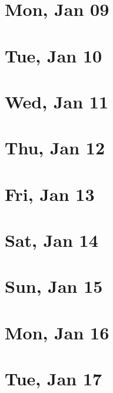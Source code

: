 	\section{Mon, Jan 09}
		
		
	\section{Tue, Jan 10}
		
		
	\section{Wed, Jan 11}
		
		
	\section{Thu, Jan 12}
		
		
	\section{Fri, Jan 13}
		
		
	\section{Sat, Jan 14}
		
		
	\section{Sun, Jan 15}
		
		
	\section{Mon, Jan 16}
		
		
	\section{Tue, Jan 17}
		
		
